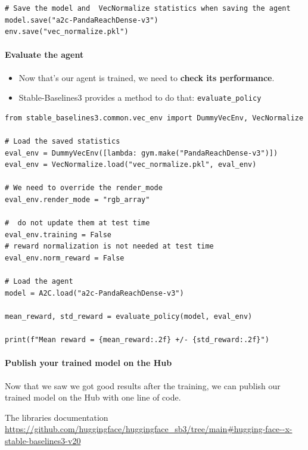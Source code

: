 \documentclass[11pt,a4paper]{article}
\begin{document}
\begin{lstlisting}
# Save the model and  VecNormalize statistics when saving the agent
model.save("a2c-PandaReachDense-v3")
env.save("vec_normalize.pkl")
\end{lstlisting}

\paragraph{Evaluate the agent}\label{evaluate-the-agent}

\begin{itemize}
\tightlist
\item
  Now that's our agent is trained, we need to \textbf{check its performance}.
\item
  Stable-Baselines3 provides a method to do that: \texttt{evaluate\_policy}
\end{itemize}

\begin{lstlisting}
from stable_baselines3.common.vec_env import DummyVecEnv, VecNormalize

# Load the saved statistics
eval_env = DummyVecEnv([lambda: gym.make("PandaReachDense-v3")])
eval_env = VecNormalize.load("vec_normalize.pkl", eval_env)

# We need to override the render_mode
eval_env.render_mode = "rgb_array"

#  do not update them at test time
eval_env.training = False
# reward normalization is not needed at test time
eval_env.norm_reward = False

# Load the agent
model = A2C.load("a2c-PandaReachDense-v3")

mean_reward, std_reward = evaluate_policy(model, eval_env)

print(f"Mean reward = {mean_reward:.2f} +/- {std_reward:.2f}")
\end{lstlisting}

\paragraph{Publish your trained model on the Hub}\label{publish-your-trained-model-on-the-hub}

Now that we saw we got good results after the training, we can publish our trained model on the Hub with one line of code.

The libraries documentation \url{https://github.com/huggingface/huggingface_sb3/tree/main#hugging-face--x-stable-baselines3-v20}
\end{document}
